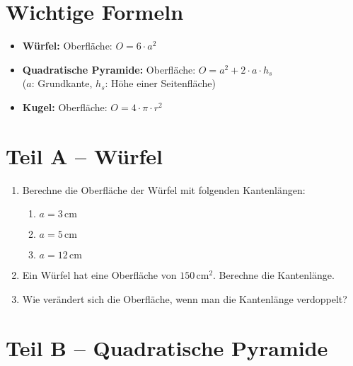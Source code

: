 \section{Wichtige Formeln}
\begin{itemize}
    \item \textbf{Würfel:} \quad Oberfläche: \( O = 6 \cdot a^2 \)
    \item \textbf{Quadratische Pyramide:} \quad Oberfläche: \( O = a^2 + 2 \cdot a \cdot h_s \)\\
    \quad (\( a \): Grundkante, \( h_s \): Höhe einer Seitenfläche)
    \item \textbf{Kugel:} \quad Oberfläche: \( O = 4 \cdot \pi \cdot r^2 \)
\end{itemize}

\vspace{1em}

\section{Teil A – Würfel}

\begin{enumerate}
    \item Berechne die Oberfläche der Würfel mit folgenden Kantenlängen:
    \begin{enumerate}
        \item \( a = 3\,\text{cm} \)
        \item \( a = 5\,\text{cm} \)
        \item \( a = 12\,\text{cm} \)
    \end{enumerate}

    \item Ein Würfel hat eine Oberfläche von \( 150\,\text{cm}^2 \). Berechne die Kantenlänge.

    \item Wie verändert sich die Oberfläche, wenn man die Kantenlänge verdoppelt?
\end{enumerate}

\vspace{1em}

\section{Teil B – Quadratische Pyramide}

